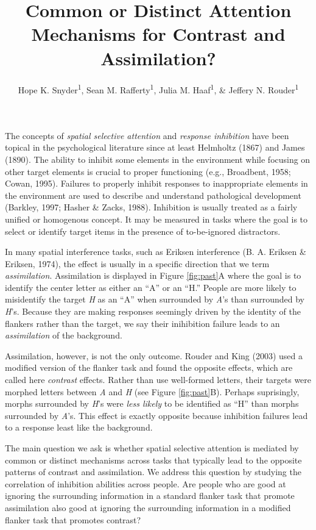 \documentclass[english,floatsintext,man]{apa6}
\title{Common or Distinct Attention Mechanisms for Contrast and Assimilation?}
\author{Hope K. Snyder\textsuperscript{1}, Sean M. Rafferty\textsuperscript{1}, Julia M. Haaf\textsuperscript{1}, \& Jeffery N. Rouder\textsuperscript{1}}
\affiliation{
    \vspace{0.5cm}
          \textsuperscript{1} University of Missouri  }
\begin{document}
\maketitle

\setcounter{secnumdepth}{0}



The concepts of \emph{spatial selective attention} and \emph{response
inhibition} have been topical in the psychological literature since at
least Helmholtz (1867) and James (1890). The ability to inhibit some
elements in the environment while focusing on other target elements is
crucial to proper functioning (e.g., Broadbent, 1958; Cowan, 1995).
Failures to properly inhibit responses to inappropriate elements in the
environment are used to describe and understand pathological development
(Barkley, 1997; Hasher \& Zacks, 1988). Inhibition is usually treated as
a fairly unified or homogenous concept. It may be measured in tasks
where the goal is to select or identify target items in the presence of
to-be-ignored distractors.

In many spatial interference tasks, such as Eriksen interference (B. A.
Eriksen \& Eriksen, 1974), the effect is usually in a specific direction
that we term \emph{assimilation}. Assimilation is displayed in Figure
\ref{fig:past}A where the goal is to identify the center letter as
either an \enquote{A} or an \enquote{H.} People are more likely to
misidentify the target \emph{H} as an \enquote{A} when surrounded by
\emph{A}'s than surrounded by \emph{H}'s. Because they are making
responses seemingly driven by the identity of the flankers rather than
the target, we say their inihibition failure leads to an
\emph{assimilation} of the background.

Assimilation, however, is not the only outcome. Rouder and King (2003)
used a modified version of the flanker task and found the opposite
effects, which are called here \emph{contrast} effects. Rather than use
well-formed letters, their targets were morphed letters between \emph{A}
and \emph{H} (see Figure \ref{fig:past}B). Perhaps suprisingly, morphs
surrounded by \emph{H}'s were \emph{less likely} to be identified as
\enquote{H} than morphs surrounded by \emph{A}'s. This effect is exactly
opposite because inhibition failures lead to a response least like the
background.

The main question we ask is whether spatial selective attention is
mediated by common or distinct mechanisms across tasks that typically
lead to the opposite patterns of contrast and assimilation. We address
this question by studying the correlation of inhibition abilities across
people. Are people who are good at ignoring the surrounding information
in a standard flanker task that promote assimilation also good at
ignoring the surrounding information in a modified flanker task that
promotes contrast?
\end{document}
